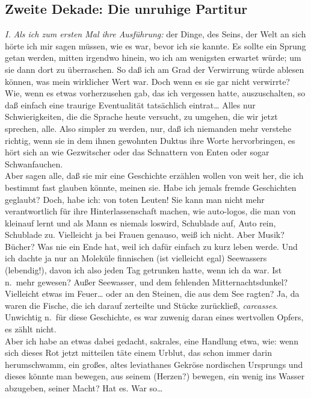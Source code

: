 \documentclass[
]{article}
\author{}
\date{\vspace{-2.5em}}
\begin{document}
\subsection{Zweite Dekade: Die unruhige
Partitur}\label{zweite-dekade-die-unruhige-partitur}

\emph{I.} \emph{Als ich zum ersten Mal ihre Ausführung:} der Dinge, des
Seins, der Welt an sich hörte ich mir sagen müssen, wie es war, bevor
ich sie kannte. Es sollte ein Sprung getan werden, mitten irgendwo
hinein, wo ich am wenigsten erwartet würde; um sie dann dort zu
überraschen. So daß ich am Grad der Verwirrung würde ablesen können, was
mein wirklicher Wert war. Doch wenn es sie gar nicht verwirrte? Wie,
wenn es etwas vorherzusehen gab, das ich vergessen hatte, auszuschalten,
so daß einfach eine traurige Eventualität tatsächlich eintrat\ldots{}
Alles nur Schwierigkeiten, die die Sprache heute versucht, zu umgehen,
die wir jetzt sprechen, alle. Also simpler zu werden, nur, daß ich
niemanden mehr verstehe richtig, wenn sie in dem ihnen gewohnten Duktus
ihre Worte hervorbringen, es hört sich an wie Gezwitscher oder das
Schnattern von Enten oder sogar Schwanfauchen.\\
Aber sagen alle, daß sie mir eine Geschichte erzählen wollen von weit
her, die ich bestimmt fast glauben könnte, meinen sie. Habe ich jemals
fremde Geschichten geglaubt? Doch, habe ich: von toten Leuten! Sie kann
man nicht mehr verantwortlich für ihre Hinterlassenschaft machen, wie
auto-logos, die man von kleinauf lernt und als Mann es niemals loswird,
Schublade auf, Auto rein, Schublade zu. Vielleicht ja bei Frauen
genauso, weiß ich nicht. Aber Musik? Bücher? Was nie ein Ende hat, weil
ich dafür einfach zu kurz leben werde. Und ich dachte ja nur an Moleküle
finnischen (ist vielleicht egal) Seewassers (lebendig!), davon ich also
jeden Tag getrunken hatte, wenn ich da war. Ist n.~mehr gewesen? Außer
Seewasser, und dem fehlenden Mitternachtsdunkel? Vielleicht etwas im
Feuer\ldots{} oder an den Steinen, die aus dem See ragten? Ja, da waren
die Fische, die ich darauf zerteilte und Stücke zurückließ,
\emph{carcasses}. Unwichtig n.~für diese Geschichte, es war zuwenig
daran eines wertvollen Opfers, es zählt nicht.\\
Aber ich habe an etwas dabei gedacht, sakrales, eine Handlung etwa, wie:
wenn sich dieses Rot jetzt mitteilen täte einem Urblut, das schon immer
darin herumschwamm, ein großes, altes leviathanes Gekröse nordischen
Ursprungs und dieses könnte man bewegen, aus seinem (Herzen?) bewegen,
ein wenig ins Wasser abzugeben, seiner Macht? Hat es. War so\ldots{}\\
\end{document}
